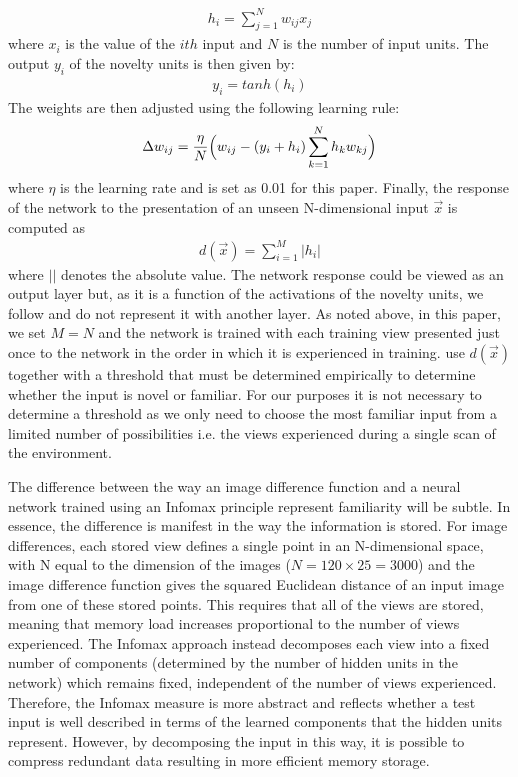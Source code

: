 \documentclass[letterpaper]{article}
\begin{document}
%
\begin{align}
    h_{i}=\sum\limits_{j=1}^N w_{ij}x_{j}   \label{eqn:infomax_activation}
\end{align}
%
where $x_{i}$ is the value of the $ith$ input and $N$ is the number of input units. 
The output $y_{i}$ of the novelty units is then given by:
%
\begin{align}
    y_{i}=tanh(h_{i})   \label{eqn:infomax_output}
\end{align}
%
The weights are then adjusted using the following learning rule: 
%
\begin{align}
    \Delta w_{ij}=\frac{\eta}{N} \Bigl( w_{ij} - (y_{i} + h_{i}) \sum\limits_{k=1}^N h_{k}w_{kj} \Bigr)   \label{eqn:infomax_learning}
\end{align}
%
where $\eta$ is the learning rate and is set as \num{0.01} for this paper. 
Finally, the response of the network to the presentation of an unseen N-dimensional input $\vec{x}$ is computed as
%
\begin{align}
    d(\vec{x})=\sum\limits_{i=1}^M |h_{i}|     \label{eqn:infomax_response}
\end{align}
%
where $||$ denotes the absolute value. 
The network response could be viewed as an output layer but, as it is a function of the activations of the novelty units, we follow \citet{Lulham2011} and do not represent it with another layer. 
As noted above, in this paper, we set $M=N$ and the network is trained with each training view presented just once to the network in the order in which it is experienced in training. 
\citet{Lulham2011} use $d(\vec{x})$ together with a threshold that must be determined empirically to determine whether the input is novel or familiar. 
For our purposes it is not necessary to determine a threshold as we only need to choose the most familiar input from a limited number of possibilities i.e. the views experienced during a single scan of the environment.

The difference between the way an image difference function and a neural network trained using an Infomax principle represent familiarity will be subtle. 
In essence, the difference is manifest in the way the information is stored. 
For image differences, each stored view defines a single point in an N-dimensional space, with N equal to the dimension of the images ($N = 120 \times 25 = 3000$) and the image difference function gives the squared Euclidean distance of an input image from one of these stored points. 
This requires that all of the views are stored, meaning that memory load increases proportional to the number of views experienced. 
The Infomax approach instead decomposes each view into a fixed number of components (determined by the number of hidden units in the network) which remains fixed, independent of the number of views experienced. 
Therefore, the Infomax measure is more abstract and reflects whether a test input is well described in terms of the learned components that the hidden units represent. 
However, by decomposing the input in this way, it is possible to compress redundant data resulting in more efficient memory storage.
\end{document}
